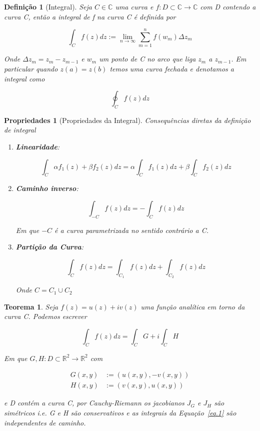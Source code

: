 \documentclass{article}
\newtheorem{prop}{Propriedades}
\newtheorem{theorem}{Teorema}
\newtheorem{definition}{Definição}
\begin{document}
\begin{definition}[Integral]
Seja $C \in \mathbb{C}$ uma curva e $f: D \subset \mathbb{C} \rightarrow \mathbb{C}$ com D contendo a curva C, então a integral de f na curva C é definida por

$$\int_C f(z) d z := \lim_{n \rightarrow \infty} \sum_{m=1}^n f(w_m) \Delta z_m$$

Onde $\Delta z_m = z_m - z_{m - 1}$ e $w_m$ um ponto de C no arco que liga $z_m$ a $z_{m - 1}$. Em particular quando $z(a) = z(b)$ temos uma curva fechada e denotamos a integral como

$$\oint_C f(z) d z$$
\end{definition}

\begin{prop}[Propriedades da Integral] Consequências diretas da definição de integral

\begin{enumerate}
    \item \textbf{Linearidade}:
    
    $$\int_C \alpha  f_1(z) + \beta f_2(z) d z = \alpha \int_C f_1(z) d z + \beta \int_C f_2(z) d z$$
    
    \item \textbf{Caminho inverso}:
    
    $$\int_{-C} f(z) d z = - \int_{C} f(z) d z$$
    
    Em que $-C$ é a curva parametrizada no sentido contrário a C.
    
    \item \textbf{Partição da Curva}:
    
    $$\int_C f(z) d z = \int_{C_1} f(z) d z + \int_{C_2} f(z) d z$$
    
    Onde $C = C_1 \cup C_2$
\end{enumerate}
\end{prop}

\begin{theorem}
Seja $f(z) = u(z) + i v(z)$ uma função analítica em torno da curva C. Podemos escrever

\begin{equation}\label{eq.1}
    \int_C f(z) dz = \int_C G + i \int_C H \nonumber
\end{equation}

Em que $G,H: D \subset \mathbb{R}^2 \rightarrow \mathbb{R}^2$ com

\begin{align*}
    G(x, y) &:= (u(x, y), - v(x, y)) \\
    H(x, y) &:= (v(x, y), u(x, y))
\end{align*}

e D contém a curva C, por Cauchy-Riemann os jacobianos $J_G$ e $J_H$ são simétricos i.e. G e H são conservativos e as integrais da Equação~\ref{eq.1} são independentes de caminho.
\end{theorem}
\end{document}
